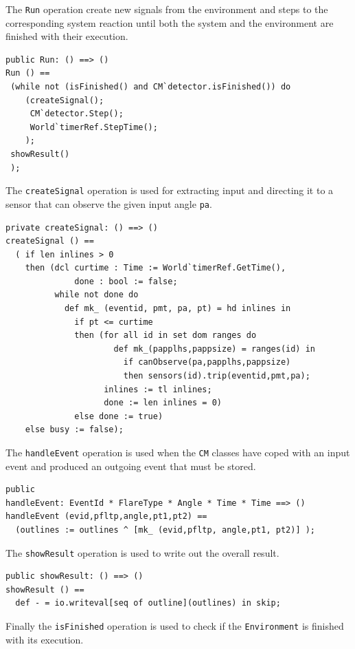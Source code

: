 \documentclass{overturerepchap}
\begin{document}
The \texttt{Run} operation create new signals from the environment and steps 
to the corresponding system reaction until both the system and the environment
are finished with their execution.

\begin{lstlisting}
public Run: () ==> ()
Run () == 
 (while not (isFinished() and CM`detector.isFinished()) do
    (createSignal();
     CM`detector.Step();
     World`timerRef.StepTime();
    );
 showResult()
 );
\end{lstlisting}

The \texttt{createSignal} operation is used for extracting input and
directing it to a sensor that can observe the given input angle \texttt{pa}.

\begin{lstlisting}
private createSignal: () ==> ()
createSignal () ==
  ( if len inlines > 0
    then (dcl curtime : Time := World`timerRef.GetTime(), 
              done : bool := false;
          while not done do
            def mk_ (eventid, pmt, pa, pt) = hd inlines in
              if pt <= curtime
              then (for all id in set dom ranges do
                      def mk_(papplhs,pappsize) = ranges(id) in
                        if canObserve(pa,papplhs,pappsize)
                        then sensors(id).trip(eventid,pmt,pa);
                    inlines := tl inlines;
                    done := len inlines = 0)
              else done := true)
    else busy := false);
\end{lstlisting}

The \texttt{handleEvent} operation is used when the \texttt{CM} classes have
coped with an input event and produced an outgoing event that must be stored.

\begin{lstlisting}
public 
handleEvent: EventId * FlareType * Angle * Time * Time ==> ()
handleEvent (evid,pfltp,angle,pt1,pt2) ==
  (outlines := outlines ^ [mk_ (evid,pfltp, angle,pt1, pt2)] );
\end{lstlisting}

The \texttt{showResult} operation is used to write out the overall result.

\begin{lstlisting}
public showResult: () ==> ()
showResult () ==
  def - = io.writeval[seq of outline](outlines) in skip;
\end{lstlisting}

Finally the \texttt{isFinished} operation is used to check if the 
\texttt{Environment} is finished with its execution.
\end{document}
